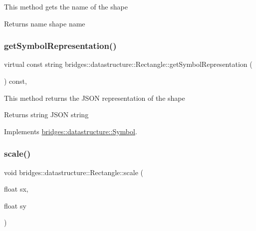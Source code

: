 This method gets the name of the shape

\begin{DoxyReturn}{Returns}
name shape name 
\end{DoxyReturn}
\mbox{\label{classbridges_1_1datastructure_1_1_rectangle_ada89ed40d2515a3518084f5460ba8dac}} 
\subsubsection{\texorpdfstring{get\+Symbol\+Representation()}{getSymbolRepresentation()}}
{\footnotesize\ttfamily virtual const string bridges\+::datastructure\+::\+Rectangle\+::get\+Symbol\+Representation (\begin{DoxyParamCaption}{ }\end{DoxyParamCaption}) const\hspace{0.3cm}{\ttfamily [inline]}, {\ttfamily [virtual]}}

This method returns the J\+S\+ON representation of the shape

\begin{DoxyReturn}{Returns}
string J\+S\+ON string 
\end{DoxyReturn}


Implements \mbox{\hyperlink{classbridges_1_1datastructure_1_1_symbol_a8044b3da559dcd9de8510ae339f126c8}{bridges\+::datastructure\+::\+Symbol}}.

\mbox{\label{classbridges_1_1datastructure_1_1_rectangle_ae17021407556e0d434b54a81d94614b3}} 
\subsubsection{\texorpdfstring{scale()}{scale()}}
{\footnotesize\ttfamily void bridges\+::datastructure\+::\+Rectangle\+::scale (\begin{DoxyParamCaption}\item[{float}]{sx,  }\item[{float}]{sy }\end{DoxyParamCaption})\hspace{0.3cm}{\ttfamily [inline]}}

